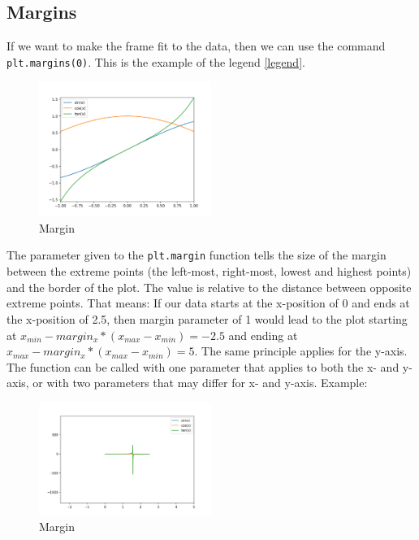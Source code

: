 \documentclass[10pt,a4paper]{article}
\newcommand{\te}{\texttt}
\begin{document}
\subsection{Margins}
If we want to make the frame fit to the data, then we can use the command \te{plt.margins(0)}. This is the example of the legend \ref{legend}.


\begin{figure}[htbp]\centering
\caption{Margin}
\includegraphics[width=0.5\textwidth]{margin.png}
\end{figure}

The parameter given to the \te{plt.margin} function tells the size of the margin between the extreme points (the left-most, right-most, lowest and highest points) and the border of the plot. The value is relative to the distance between opposite extreme points. That means: If our data starts at the x-position of 0 and ends at the x-position of 2.5, then margin parameter of 1 would lead to the plot starting at $x_{min}-margin_x*(x_{max}-x_{min}) = -2.5$ and ending at $x_{max}-margin_x*(x_{max}-x_{min}) = 5$. The same principle applies for the y-axis. The function can be called with one parameter that applies to both the x- and y-axis, or with two parameters that may differ for x- and y-axis.
Example:




\begin{figure}[htbp]\centering
\caption{Margin}
\includegraphics[width=0.5\textwidth]{margin1.png}
\end{figure}
\end{document}

